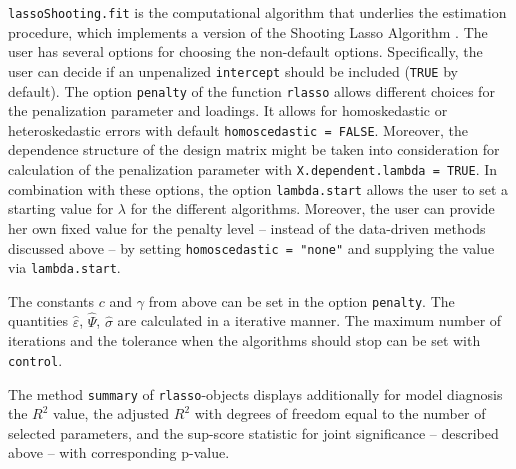 \documentclass{amsart}\usepackage[]{graphicx}\usepackage[]{color}
\newcommand{\code}[1]{\texttt{#1}}
\begin{document}
 \code{lassoShooting.fit} is the computational algorithm that underlies the estimation procedure, which implements a version of the Shooting Lasso Algorithm \citep{Fu1998}. The user has several options for choosing the non-default options. Specifically, the user can decide if an unpenalized \code{intercept} should be included (\code{TRUE} by default). The option \code{penalty} of the function \code{rlasso} allows different choices for the penalization parameter and loadings. It allows for homoskedastic or heteroskedastic errors with default \code{homoscedastic = FALSE}. Moreover, the dependence structure of the design matrix might be taken into consideration for calculation of the penalization parameter with \code{X.dependent.lambda = TRUE}. In combination with these options, the option \code{lambda.start} allows the user to set a starting value for $\lambda$ for the different algorithms. Moreover, the user can provide her own fixed value for the penalty level -- instead of the data-driven methods discussed above --  by setting \code{homoscedastic = "none"} and  supplying the value via \code{lambda.start}.
 

The constants $c$ and $\gamma$ from above can be set in the option \code{penalty}.
The quantities $\hat{\varepsilon}$, $\hat{\Psi}$, $\hat{\sigma}$ are calculated in a iterative manner. The maximum number of iterations and the tolerance when the algorithms should  stop can be set with \code{control}.

The method \texttt{summary} of \texttt{rlasso}-objects displays additionally for model diagnosis the $R^2$ value, the adjusted $R^2$ with degrees of freedom equal to the number of selected parameters, and the sup-score statistic for joint significance -- described above -- with corresponding p-value.
\end{document}
